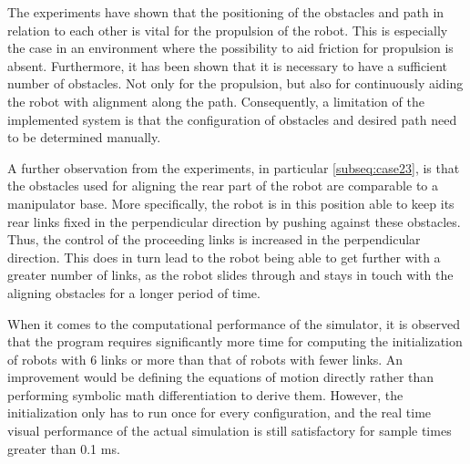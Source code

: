 The experiments have shown that the positioning of the obstacles and path in relation to each other is vital for the propulsion of the robot. This is especially the case in an environment where the possibility to aid friction for propulsion is absent. Furthermore, it has been shown that it is necessary to have a sufficient number of obstacles. Not only for the propulsion, but also for continuously aiding the robot with alignment along the path. Consequently, a limitation of the implemented system is that the configuration of obstacles and desired path need to be determined manually.

A further observation from the experiments, in particular \ref{subseq:case23}, is that the obstacles used for aligning the rear part of the robot are comparable to a manipulator base. More specifically, the robot is in this position able to keep its rear links fixed in the perpendicular direction by pushing against these obstacles. Thus, the control of the proceeding links is increased in the perpendicular direction.
This does in turn lead to the robot being able to get further with a greater number of links, as the robot slides through and stays in touch with the aligning obstacles for a longer period of time.

When it comes to the computational performance of the simulator, it is observed that the program requires significantly more time for computing the initialization of robots with 6 links or more than that of robots with fewer links. An improvement would be defining the equations of motion directly rather than performing symbolic math differentiation to derive them. However, the initialization only has to run once for every configuration, and the real time visual performance of the actual simulation is still satisfactory for sample times greater than 0.1 ms.



